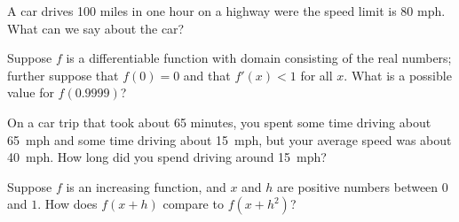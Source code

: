 \documentclass{ximera}
\newcommand{\recommendation}[1]{}
\begin{document}


\begin{problem}
  A car drives 100 miles in one hour on a highway were the speed limit
  is 80 mph.  What can we say about the car?
  \begin{multipleChoice}
  \end{multipleChoice}
\end{problem}

\begin{problem}
  Suppose $f$ is a differentiable function with domain consisting of
  the real numbers; further suppose that $f(0) = 0$ and that $f'(x) <
  1$ for all $x$.  What is a possible value for $f(0.9999)$?
  \begin{multipleChoice}
  \end{multipleChoice}
\end{problem}

\begin{problem}
  On a car trip that took about 65 minutes, you spent some time
  driving about 65~mph and some time driving about 15~mph, but your
  average speed was about 40~mph.  How long did you spend driving
  around 15~mph?
  \begin{multipleChoice}
  \end{multipleChoice}
\end{problem}

\begin{problem}
  Suppose $f$ is an increasing function, and $x$ and $h$ are positive numbers between $0$ and $1$.  How does $f(x + h)$ compare to $f(x + h^2)$?
  \begin{multipleChoice}
  \end{multipleChoice}
\end{problem}
\end{document}
